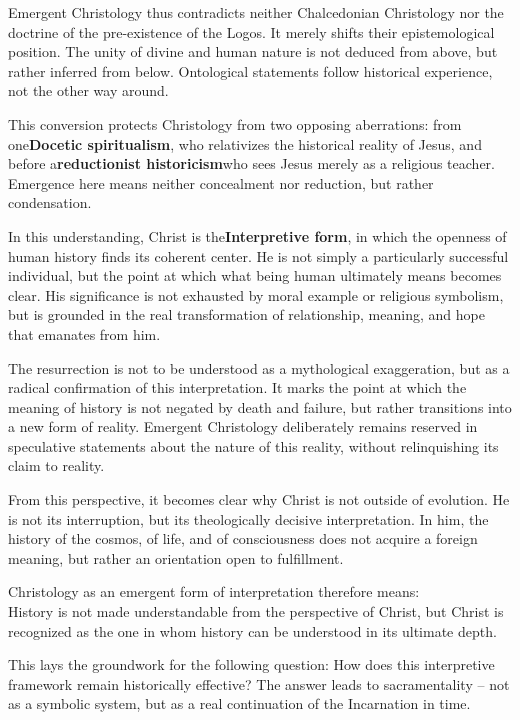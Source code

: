 \documentclass[
]{article}
\begin{document}
Emergent Christology thus contradicts neither Chalcedonian Christology nor the doctrine of the pre-existence of the Logos. It merely shifts their epistemological position. The unity of divine and human nature is not deduced from above, but rather inferred from below. Ontological statements follow historical experience, not the other way around.

This conversion protects Christology from two opposing aberrations: from one\textbf{Docetic spiritualism}, who relativizes the historical reality of Jesus, and before a\textbf{reductionist historicism}who sees Jesus merely as a religious teacher. Emergence here means neither concealment nor reduction, but rather condensation.

In this understanding, Christ is the\textbf{Interpretive form}, in which the openness of human history finds its coherent center. He is not simply a particularly successful individual, but the point at which what being human ultimately means becomes clear. His significance is not exhausted by moral example or religious symbolism, but is grounded in the real transformation of relationship, meaning, and hope that emanates from him.

The resurrection is not to be understood as a mythological exaggeration, but as a radical confirmation of this interpretation. It marks the point at which the meaning of history is not negated by death and failure, but rather transitions into a new form of reality. Emergent Christology deliberately remains reserved in speculative statements about the nature of this reality, without relinquishing its claim to reality.

From this perspective, it becomes clear why Christ is not outside of evolution. He is not its interruption, but its theologically decisive interpretation. In him, the history of the cosmos, of life, and of consciousness does not acquire a foreign meaning, but rather an orientation open to fulfillment.

Christology as an emergent form of interpretation therefore means:\\
History is not made understandable from the perspective of Christ, but Christ is recognized as the one in whom history can be understood in its ultimate depth.

This lays the groundwork for the following question: How does this interpretive framework remain historically effective? The answer leads to sacramentality -- not as a symbolic system, but as a real continuation of the Incarnation in time.
\end{document}

